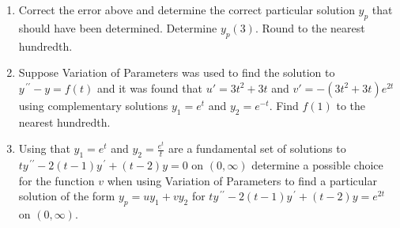 \documentclass{ximera}
\begin{document}
\begin{enumerate}[label=(\arabic*)]
\begin{enumerate}[label=(\alph*)]
\item The function $\frac{2}{3}x^3-x^2$ is not an antiderivative of $2x^2-2x$.

\item $(-2(x-2)e^x)x+\left(\frac{2}{3}x^3-x^2\right)e^x \neq \left(\frac{2}{3}x^3-3x^2+4x\right)e^x$.

\end{enumerate}


\item Correct the error above and determine the correct particular solution $y_p$ that should have been determined.  Determine $y_p(3)$.  Round to the nearest hundredth.


\newpage


\item Suppose Variation of Parameters was used to find the solution to \\ $y^{\,\prime\prime}-y=f(t)$ and it was found that $u'=3t^2+3t$ and $v'=-(3t^2+3t)e^{2t}$ using complementary solutions $y_1=e^t$ and $y_2=e^{-t}$.  Find $f(1)$ to the nearest hundredth.















\item Using that $y_1=e^{t}$ and $\displaystyle y_2=\frac{e^t}{t}$ are a fundamental set of solutions to \\$ty^{\,\prime\prime}-2(t-1)y^{\,\prime}+(t-2)y=0$ on $(0,\infty)$ determine a possible choice for the function $v$ when using Variation of Parameters to find a particular solution of the form $y_p=uy_1+vy_2$ for $ty^{\,\prime\prime}-2(t-1)y^{\,\prime}+(t-2)y=e^{2t}$ on $(0,\infty)$.


\end{enumerate}
\end{document}
